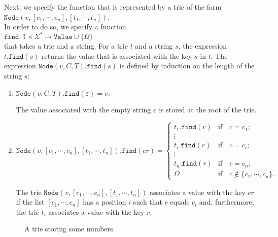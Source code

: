 Next, we specify the function that is represented by a trie of the form 
\\[0.2cm]
\hspace*{1.3cm} 
$\texttt{Node}(v, [c_1, \cdots, c_n], [t_1, \cdots, t_n])$.
\\[0.2cm]
In order to do so, we specify a function
\\[0.2cm]
\hspace*{1.3cm} 
$\texttt{find}: \mathbb{T} \times \Sigma^* \rightarrow \texttt{Value} \cup \{ \Omega\}$
\\[0.2cm]
that takes a trie and a string.  For a trie $t$ and a string $s$, the expression $t.\texttt{find}(s)$ returns the
value that is associated with the key $s$ in $t$.  The expression
$\texttt{Node}(v,C,T).\texttt{find}(s)$ is defined by induction on the length of the  string $s$:
\begin{enumerate}
\item $\texttt{Node}(v, C, T).\texttt{find}(\varepsilon) = v$.

      The value associated with the empty string $\varepsilon$ is stored at the root of the trie.
\item $\texttt{Node}(v, [c_1, \cdots, c_n], [t_1, \cdots, t_n]).\texttt{find}(cr) = 
        \left\{
        \begin{array}{ll}
        t_1.\texttt{find}(r) & \mbox{if} \quad c = c_1 \mbox{;} \\
        \vdots &                                     \\
        t_i.\texttt{find}(r) & \mbox{if} \quad c = c_i \mbox{;} \\
        \vdots &                                     \\
        t_n.\texttt{find}(r) & \mbox{if} \quad c = c_n \mbox{;} \\[0.2cm]
        \Omega               & \mbox{if} \quad c \notin \{c_1,\cdots,c_n\} \mbox{.}         
        \end{array}
       \right.$

      The trie $\texttt{Node}(v, [c_1, \cdots, c_n], [t_1, \cdots, t_n])$ associates a value with
      the key $cr$ if the list $[c_1, \cdots, c_n]$ has a position $i$ such that $c$ equals $c_i$
      and, furthermore, the trie  $t_i$ associates a value with the key  $r$.
\end{enumerate}

\begin{figure}[!ht]
  \centering
  \caption{A trie storing some numbers.}
  \label{fig:trie}
\end{figure}

